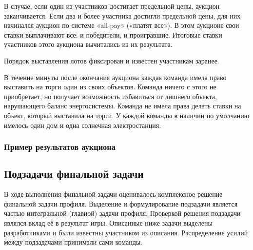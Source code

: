 В случае, если один из участников достигает предельной цены, аукцион заканчивается. Если два и более участника достигли предельной цены, для них начинался аукцион по системе «all-pay» («платят все»). В этом аукционе свои ставки выплачивают все: и победители, и проигравшие. Итоговые ставки участников этого аукциона вычитались из их результата.

Порядок выставления лотов фиксирован и известен участникам заранее.

В течение минуты после окончания аукциона каждая команда имела право выставить на торги один из своих объектов. Команда ничего с этого не приобретает, но получает возможность избавиться от лишнего объекта, нарушающего баланс энергосистемы. Команда не имела права делать ставки на объект, который выставила на торги. У каждой команды в наличии по умолчанию имелось один дом и одна солнечная электростанция.

\subsubsection*{Пример результатов аукциона}


\subsection*{Подзадачи финальной задачи}

В ходе выполнения финальной задачи оценивалось комплексное решение финальной задачи профиля. Выделение и формулирование подзадачи является частью интегральной (главной) задачи профиля. Проверкой решения подзадачи являлся вклад её в результат игры. Описанные ниже задачи выделены разработчиками и были известны участником из описания. Распределение усилий между подзадачами принимали сами команды.


